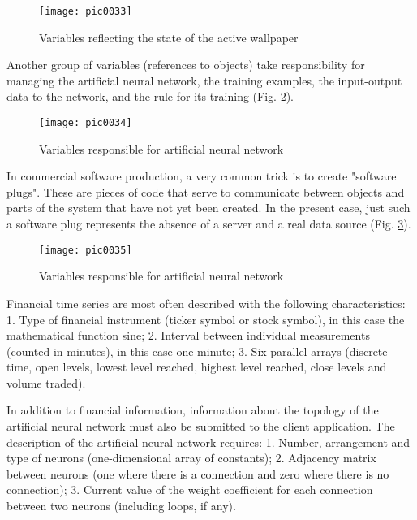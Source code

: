 \begin{figure}[h]
\centering
\texttt{[image: pic0033]}
\caption{Variables reflecting the state of the active wallpaper}
\label{fig:pic0033}
\end{figure}
\FloatBarrier

Another group of variables (references to objects) take responsibility for managing the artificial neural network, the training examples, the input-output data to the network, and the rule for its training (Fig. \ref{fig:pic0034}).

\begin{figure}[h]
\centering
\texttt{[image: pic0034]}
\caption{Variables responsible for artificial neural network}
\label{fig:pic0034}
\end{figure}
\FloatBarrier

In commercial software production, a very common trick is to create "software plugs". These are pieces of code that serve to communicate between objects and parts of the system that have not yet been created. In the present case, just such a software plug represents the absence of a server and a real data source (Fig. \ref{fig:pic0035}).

\begin{figure}[h]
\centering
\texttt{[image: pic0035]}
\caption{Variables responsible for artificial neural network}
\label{fig:pic0035}
\end{figure}
\FloatBarrier

Financial time series are most often described with the following characteristics: 1. Type of financial instrument (ticker symbol or stock symbol), in this case the mathematical function sine; 2. Interval between individual measurements (counted in minutes), in this case one minute; 3. Six parallel arrays (discrete time, open levels, lowest level reached, highest level reached, close levels and volume traded).

In addition to financial information, information about the topology of the artificial neural network must also be submitted to the client application. The description of the artificial neural network requires: 1. Number, arrangement and type of neurons (one-dimensional array of constants); 2. Adjacency matrix between neurons (one where there is a connection and zero where there is no connection); 3. Current value of the weight coefficient for each connection between two neurons (including loops, if any).

